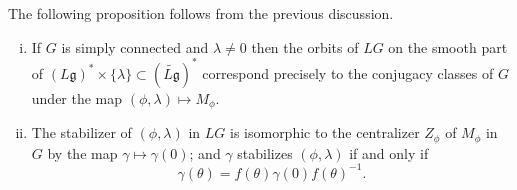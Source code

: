 \documentclass[12pt]{article}
\begin{document}
The following proposition follows from the previous discussion.
\begin{proposition}
    \leavevmode
    \begin{enumerate}[(i)]
        \item If $G$ is simply connected and $\lambda \neq 0$ then the orbits of $LG$
              on the smooth part of $(L\mathfrak{g})^* \times \{\lambda\} \subset (\widetilde{L\mathfrak{g}})^*$
              correspond precisely to the conjugacy classes of $G$ under the map
              $(\phi,\lambda) \mapsto M_\phi$.
        \item The stabilizer of $(\phi,\lambda)$ in $LG$ is isomorphic to the centralizer
              $Z_\phi$ of $M_\phi$ in $G$ by the map $\gamma \mapsto \gamma(0)$; and
              $\gamma$ stabilizes $(\phi,\lambda)$ if and only if
              \[
                  \gamma(\theta) = f(\theta)\gamma(0)f(\theta)^{-1}.
              \]
    \end{enumerate}
\end{proposition}
\end{document}
